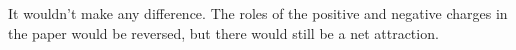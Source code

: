 It wouldn't make any difference. The roles of the positive and
negative charges in the paper would be reversed, but there would still be a net attraction.




